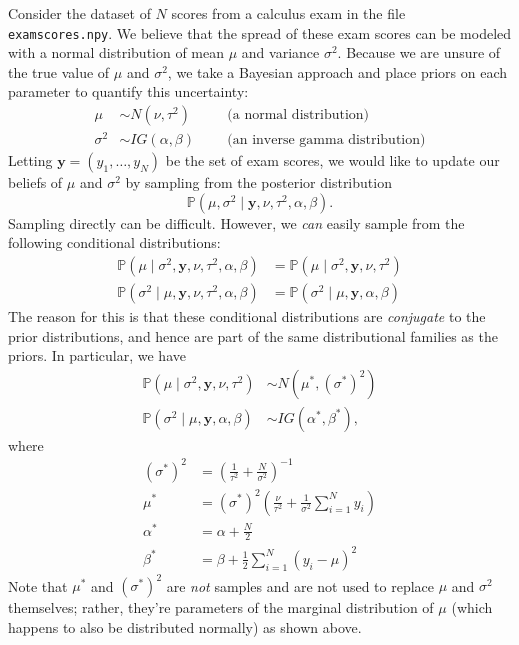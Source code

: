 Consider the dataset of $N$ scores from a calculus exam in the file \texttt{examscores.npy}.
We believe that the spread of these exam scores can be modeled with a normal distribution of mean $\mu$ and variance $\sigma^{2}$.
Because we are unsure of the true value of $\mu$ and $\sigma^2$, we take a Bayesian approach and place priors on each parameter to quantify this uncertainty:
\begin{align*}
\mu & \sim N(\nu, \tau^{2})\quad &&\text{(a normal distribution)} \\
\sigma^{2} & \sim IG(\alpha, \beta) &&\text{(an inverse gamma distribution)}
\end{align*}
Letting $\mathbf{y} = (y_1,\ldots,y_N)$ be the set of exam scores, we would like to update our beliefs of $\mu$ and $\sigma^2$ by sampling from the posterior
distribution
\begin{equation*}
\mathbb{P}(\mu, \sigma^{2} \mid \mathbf{y}, \nu, \tau^{2}, \alpha, \beta).
\end{equation*}
Sampling directly can be difficult. However, we \emph{can} easily sample from the following conditional distributions:
\begin{align*}
\mathbb{P}(\mu \mid \sigma^{2}, \mathbf{y}, \nu, \tau^{2}, \alpha, \beta) & = \mathbb{P}(\mu \mid \sigma^{2}, \mathbf{y}, \nu, \tau^{2})\\
\mathbb{P}(\sigma^{2} \mid \mu, \mathbf{y}, \nu, \tau^{2}, \alpha, \beta) & = \mathbb{P}(\sigma^{2} \mid \mu, \mathbf{y}, \alpha, \beta)
\end{align*}
The reason for this is that these conditional distributions are \emph{conjugate} to the prior distributions, and hence are part of the same distributional
families as the priors. In particular, we have
\begin{align*}
\mathbb{P}(\mu \mid \sigma^{2}, \mathbf{y}, \nu, \tau^{2}) &\sim N(\mu^*, (\sigma^*)^2)\\
\mathbb{P}(\sigma^{2} \mid \mu, \mathbf{y}, \alpha, \beta) &\sim IG(\alpha^*, \beta^*),
\end{align*}
where
\begin{align*}
(\sigma^*)^2 &= \left(\frac{1}{\tau^2}+\frac{N}{\sigma^2}\right)^{-1}\\
\mu^* &= (\sigma^*)^2\left(\frac{\nu}{\tau^2} + \frac{1}{\sigma^2}\sum_{i=1}^N y_i \right)\\
\alpha^* &= \alpha + \frac{N}{2}\\
\beta^* &= \beta + \frac{1}{2}\sum_{i=1}^N (y_i-\mu)^2
\end{align*}
Note that $\mu^*$ and $\left(\sigma^*\right)^2$ are \emph{not} samples and are not used to replace $\mu$ and $\sigma^2$ themselves; rather, they're parameters of the marginal distribution of $\mu$ (which happens to also be distributed normally) as shown above.

